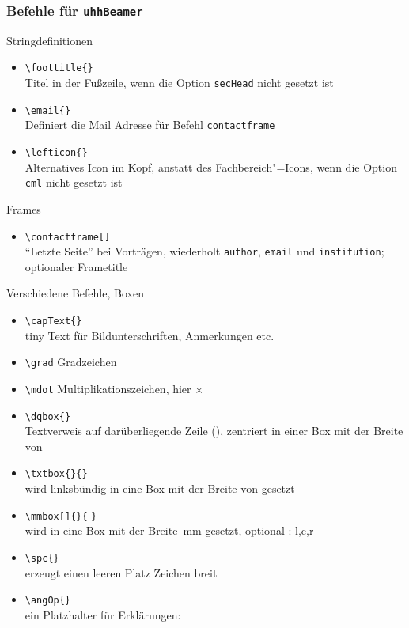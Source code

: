 \documentclass[usepdftitle=false, t]{beamer}
\begin{document}
\begin{frame}
  \frametitle{Befehle für \texttt{uhhBeamer}}
  Stringdefinitionen
  \begin{itemize}
  \item \verb+\foottitle{+\verb+}+\\
	Titel in der Fußzeile, wenn die Option \alert{\texttt{secHead}}
	nicht gesetzt ist
  \item \verb+\email{+\verb+}+\\
	Definiert die Mail Adresse für Befehl \alert{\texttt{contactframe}}
  \item \verb+\lefticon{+\verb+}+\\
	Alternatives Icon im Kopf, anstatt des Fachbereich"=Icons, wenn
	die Option \alert{\texttt{cml}} nicht gesetzt ist
  \end{itemize}

\vfill
  Frames
  \begin{itemize}
  \item \verb+\contactframe[+\verb+]+\\
	"`Letzte Seite"' bei Vorträgen, wiederholt \texttt{author},
	\texttt{email} und \texttt{institution}; optionaler Frametitle
  \end{itemize}

\framebreak
  Verschiedene Befehle, Boxen
  \begin{itemize}
  \item \verb+\capText{+\verb+}+\\
	tiny Text für Bildunterschriften, Anmerkungen etc.
  \item \verb+\grad+ Gradzeichen
  \item \verb+\mdot+ Multiplikationszeichen, hier $\times$
  \item \verb+\dqbox{+\verb+}+\\
	Textverweis auf darüberliegende Zeile (),
	zentriert in einer Box mit der Breite von 
  \item \verb+\txtbox{+\verb+}{+\verb+}+\\
	 wird linksbündig in eine Box mit der Breite
	von  gesetzt
  \item \verb+\mmbox[+\verb+]{+\verb+}{+%
	\verb+}+\\
	 wird in eine Box mit der Breite \,mm
	gesetzt, optional : l,c,r
  \item \verb+\spc{+\verb+}+\\
	erzeugt einen leeren Platz  Zeichen breit
  \item \verb+\angOp{+\verb+}+\\
	ein Platzhalter für Erklärungen: 
  \end{itemize}


\end{frame}
\end{document}
